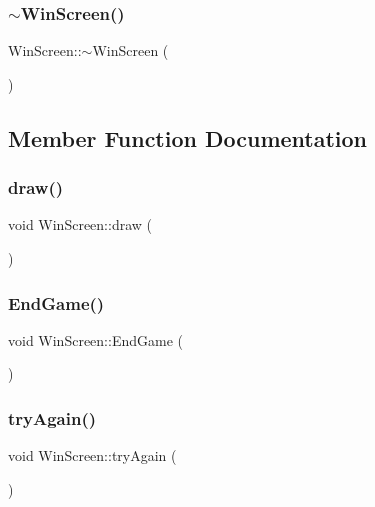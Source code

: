 \mbox{\label{class_win_screen_aba525624740b518cf6e14cd66d79a992}} 
\subsubsection{\texorpdfstring{$\sim$WinScreen()}{~WinScreen()}}
{\footnotesize\ttfamily Win\+Screen\+::$\sim$\+Win\+Screen (\begin{DoxyParamCaption}{ }\end{DoxyParamCaption})}



\subsection{Member Function Documentation}
\mbox{\label{class_win_screen_a132ab3f47f674d9d5ed8764d1833f622}} 
\subsubsection{\texorpdfstring{draw()}{draw()}}
{\footnotesize\ttfamily void Win\+Screen\+::draw (\begin{DoxyParamCaption}{ }\end{DoxyParamCaption})}

\mbox{\label{class_win_screen_af2363010d372b196b5f200a803ffb9d5}} 
\subsubsection{\texorpdfstring{EndGame()}{EndGame()}}
{\footnotesize\ttfamily void Win\+Screen\+::\+End\+Game (\begin{DoxyParamCaption}{ }\end{DoxyParamCaption})}

\mbox{\label{class_win_screen_a38b93d4d936808d6462abb7cb68036d2}} 
\subsubsection{\texorpdfstring{tryAgain()}{tryAgain()}}
{\footnotesize\ttfamily void Win\+Screen\+::try\+Again (\begin{DoxyParamCaption}{ }\end{DoxyParamCaption})}

